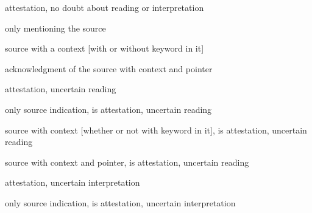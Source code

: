 \documentclass[10pt]{article}
\let\tempeone\enumerate
\let\tempetwo\endenumerate
\renewenvironment{enumerate}{\tempeone\setlength\itemsep{-0.5pt}\setlength{\partopsep}{-0.5pt}\setlength{\parsep}{-0.5pt}\setlength{\topsep}{-0.5pt}}{\tempetwo}
\begin{document}
{

\begin{enumerate}
	\item {\fontsize{10pt}{12.0pt}\selectfont attestation, no doubt about reading or interpretation}

\begin{enumerate}
	\item {\fontsize{10pt}{12.0pt}\selectfont only mentioning the source\par}

	\item {\fontsize{10pt}{12.0pt}\selectfont source with a context [with or without keyword in it]\par}\par

	\item {\fontsize{10pt}{12.0pt}\selectfont acknowledgment of the source with context and pointer \par}\par


\end{enumerate}
	\item {\fontsize{10pt}{12.0pt}\selectfont attestation, uncertain reading\par}

\begin{enumerate}
	\item {\fontsize{10pt}{12.0pt}\selectfont only source indication, is attestation, uncertain reading\par}\par

	\item {\fontsize{10pt}{12.0pt}\selectfont source with context [whether or not with keyword in it], is attestation, uncertain reading\par}\par

	\item {\fontsize{10pt}{12.0pt}\selectfont source with context and poi\setlength{\topsep}{-3\parskip}nter, is attestation, uncertain reading\par}\par


\end{enumerate}
	\item {\fontsize{10pt}{12.0pt}\selectfont attestation, uncertain interpretation\par}\par

\begin{enumerate}
	\item {\fontsize{10pt}{12.0pt}\selectfont only source indication, is attestation, uncertain interpretation\par}\par


\end{enumerate}
\end{enumerate}}
\end{document}
